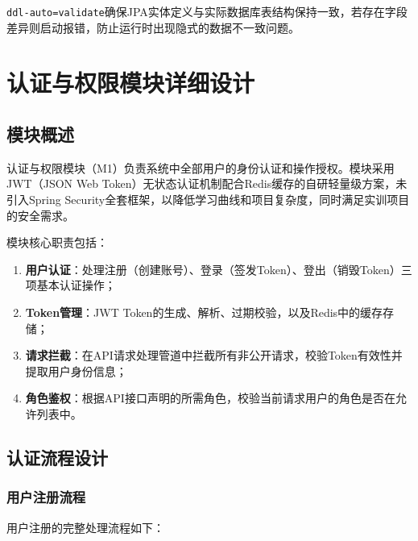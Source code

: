 \documentclass{../softeng}
\begin{document}
\verb|ddl-auto=validate|确保JPA实体定义与实际数据库表结构保持一致，若存在字段差异则启动报错，防止运行时出现隐式的数据不一致问题。

\section{认证与权限模块详细设计}

\subsection{模块概述}

认证与权限模块（M1）负责系统中全部用户的身份认证和操作授权。模块采用JWT（JSON Web Token）无状态认证机制配合Redis缓存的自研轻量级方案，未引入Spring Security全套框架，以降低学习曲线和项目复杂度，同时满足实训项目的安全需求。

模块核心职责包括：
\begin{enumerate}
    \item \textbf{用户认证}：处理注册（创建账号）、登录（签发Token）、登出（销毁Token）三项基本认证操作；
    \item \textbf{Token管理}：JWT Token的生成、解析、过期校验，以及Redis中的缓存存储；
    \item \textbf{请求拦截}：在API请求处理管道中拦截所有非公开请求，校验Token有效性并提取用户身份信息；
    \item \textbf{角色鉴权}：根据API接口声明的所需角色，校验当前请求用户的角色是否在允许列表中。
\end{enumerate}

\subsection{认证流程设计}

\subsubsection{用户注册流程}

用户注册的完整处理流程如下：
\end{document}
